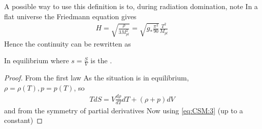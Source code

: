 \documentclass{article}
\begin{document}
\begin{example}
A possible way to use this definition is to, during radiation domination, note 
In a flat universe the Friedmann equation gives 
\begin{align}\label{eq:CSM:5}
H = \sqrt{\frac{\rho}{3 M_{pl}^2}} = \sqrt{g_\ast \frac{\pi^2}{90} } \frac{T^2}{M_{pl}}
\end{align}
Hence the continuity can be rewritten as 
\end{example}

\begin{prop}
In equilibrium
where $s=\frac{S}{V}$ is the .
\end{prop}
\begin{proof}
From the first law
As the situation is in equilibrium, $\rho=\rho(T), p=p(T)$, so 
\begin{align} \label{eq:CSM:3}
TdS = V \frac{d\rho}{dT} dT + (\rho + p) dV
\end{align}
and from the symmetry of partial derivatives 
Now using \ref{eq:CSM:3} 
(up to a constant)
\end{proof}
\end{document}
